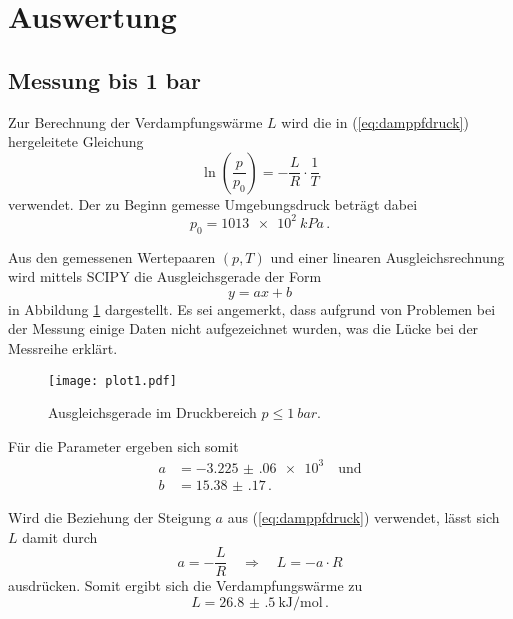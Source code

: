 \section{Auswertung}
\label{sec:Auswertung}

\subsection{Messung bis 1 bar}

Zur Berechnung der Verdampfungswärme $L$ wird die in (\ref{eq:damppfdruck}) hergeleitete Gleichung 
\begin{equation}
    \ln \left(\frac{p}{p_{0}}\right) = -\frac{L}{R} \cdot \frac{1}{T}
\end{equation}
verwendet. Der zu Beginn gemesse Umgebungsdruck beträgt dabei
\begin{equation}
    p_{0} = \qty{1013e2}{kPa} \, .
\end{equation}

Aus den gemessenen Wertepaaren $(p,T)$ und einer linearen Ausgleichsrechnung
wird mittels SCIPY \cite{scipy} die Ausgleichsgerade der Form
\begin{equation}
    y = ax + b 
\end{equation}
in Abbildung \ref{fig:plot1} dargestellt.
Es sei angemerkt, dass aufgrund von Problemen bei der Messung einige Daten nicht aufgezeichnet wurden,
was die Lücke bei der Messreihe erklärt.
\begin{figure}[H]
    \centering
    \texttt{[image: plot1.pdf]}
    \caption{Ausgleichsgerade im Druckbereich $p \leq \qty{1}{bar}$.}
    \label{fig:plot1}
\end{figure}

Für die Parameter ergeben sich somit
\begin{align*}
    a &= \num{-3.225(060)e3} \quad \text{und} \\
    b &= \num{15.38(17)} \, .
\end{align*}

Wird die Beziehung der Steigung $a$ aus (\ref{eq:damppfdruck}) verwendet, lässt sich $L$ damit durch
\begin{equation}
    a = -\frac{L}{R} \quad \Rightarrow \quad L=-a \cdot R
\end{equation}
ausdrücken. 
Somit ergibt sich die Verdampfungswärme zu
\begin{equation}
    L = \qty{26.8(5)}{\kilo\joule\per\mol} \, .
\end{equation}

